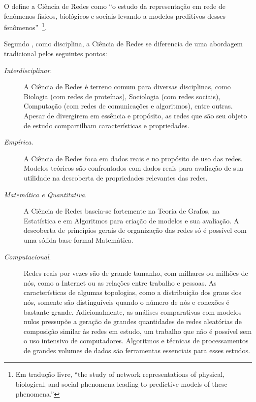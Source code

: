 \documentclass[12pt,a4paper,final]{article}
\begin{document}
O  define a Ciência de Redes como \enquote{o estudo da representação em rede de fenômenos físicos, biológicos e sociais levando a modelos preditivos desses fenômenos}~\footnote{Em tradução livre, \enquote{the study of network representations of physical, biological, and social phenomena leading to predictive models of these phenomena.}}.

Segundo , como disciplina, a Ciência de Redes se diferencia de uma abordagem tradicional pelos seguintes pontos:

\begin{description}
	\item[\textit{Interdisciplinar}.] A Ciência de Redes é terreno comum para diversas disciplinas, como Biologia (com redes de proteínas), Sociologia (com redes sociais), Computação (com redes de comunicações e algoritmos), entre outras. Apesar de divergirem em essência e propósito, as redes que são seu objeto de estudo compartilham características e propriedades.
    
    \item[\textit{Empírica}.] A Ciência de Redes foca em dados reais e no propósito de uso das redes. Modelos teóricos são confrontados com dados reais para avaliação de sua utilidade na descoberta de propriedades relevantes das redes.
    
    \item[\textit{Matemática e Quantitativa}.] A Ciência de Redes baseia-se fortemente na Teoria de Grafos, na Estatística e em Algoritmos para criação de modelos e sua avaliação. A descoberta de princípios gerais de organização das redes só é possível com uma sólida base formal Matemática.
    
    \item[\textit{Computacional}.] Redes reais por vezes são de grande tamanho, com milhares ou milhões de nós, como a Internet ou as relações entre trabalho e pessoas. As características de algumas topologias, como a distribuição dos graus dos nós, somente são distinguíveis quando o número de nós e conexões é bastante grande. Adicionalmente, as análises comparativas com modelos nulos pressupõe a geração de grandes quantidades de redes aleatórias de composição similar às redes em estudo, um trabalho que não é possível sem o uso intensivo de computadores. Algoritmos e técnicas de processamentos de grandes volumes de dados são ferramentas essenciais para esses estudos.
\end{description}
\end{document}
